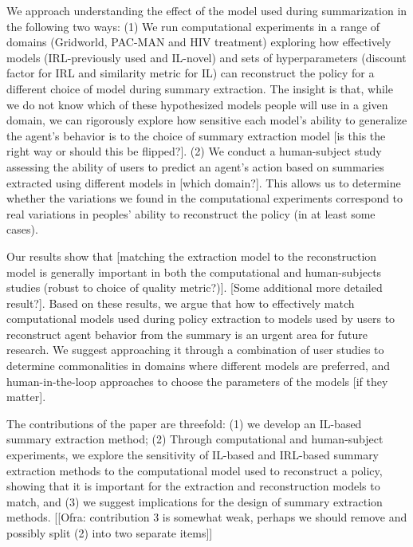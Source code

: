 \documentclass{article}
\newcommand{\comment}[2]{{\color{blue} [[{#1}: {#2}]]}}
\begin{document}
We approach understanding the effect of the model used during summarization in the following two ways: (1) We run computational experiments in a range of domains (Gridworld, PAC-MAN and HIV treatment) exploring how effectively models (IRL-previously used and IL-novel) and sets of hyperparameters (discount factor for IRL and similarity metric for IL) can reconstruct the policy for a different choice of model during summary extraction.  The insight is that, while we do not know which of these hypothesized models people will use in a given domain, we can rigorously explore how sensitive each model's ability to generalize the agent's behavior is to the choice of summary extraction model [is this the right way or should this be flipped?].  (2) We conduct a human-subject study assessing the ability of users to predict an agent's action based on summaries extracted using different models in [which domain?].  This allows us to determine whether the variations we found in the computational experiments correspond to real variations in peoples' ability to reconstruct the policy (in at least some cases).  

Our results show that [matching the extraction model to the reconstruction model is generally important in both the computational and human-subjects studies (robust to choice of quality metric?)].  [Some additional more detailed result?].  Based on these results, we argue that how to effectively match computational models used during policy extraction to models used by users to reconstruct agent behavior from the summary is an urgent area for future research.  We suggest approaching it through a combination of user studies to determine commonalities in domains where different models are preferred, and human-in-the-loop approaches to choose the parameters of the models [if they matter].

The contributions of the paper are threefold: (1) we develop an IL-based summary extraction method; (2) Through computational and human-subject experiments, we explore the sensitivity of IL-based and IRL-based summary extraction methods to the computational model used to reconstruct a policy, showing that it is important for the extraction and reconstruction models to match, and (3) we suggest implications for the design of summary extraction methods. \comment{Ofra}{contribution 3 is somewhat weak, perhaps we should remove and possibly split (2) into two separate items}
\end{document}

